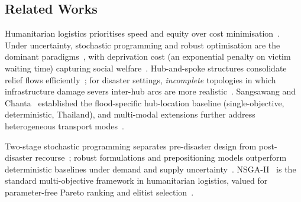 \documentclass{llncs}
\begin{document}
%

\subsection{Related Works}

Humanitarian logistics prioritises speed and equity over cost minimisation~\cite{van2006humanitarian}. Under uncertainty, stochastic programming and robust optimisation are the dominant paradigms~\cite{donmez2021humanitarian,boonmee2017facility}, with deprivation cost (an exponential penalty on victim waiting time) capturing social welfare~\cite{holguin2013appropriate}. Hub-and-spoke structures consolidate relief flows efficiently~\cite{campbell1994integer}; for disaster settings, \emph{incomplete} topologies in which infrastructure damage severs inter-hub arcs are more realistic~\cite{alumur2009incomplete}. Sangsawang and Chanta~\cite{sangsawang2020capacitated} established the flood-specific hub-location baseline (single-objective, deterministic, Thailand), and multi-modal extensions further address heterogeneous transport modes~\cite{Li2023}.

Two-stage stochastic programming separates pre-disaster design from post-disaster recourse~\cite{tofighi2016humanitarian}; robust formulations and prepositioning models outperform deterministic baselines under demand and supply uncertainty~\cite{Yahyaei2019,salman2015emergency}. NSGA-II~\cite{deb2002fast} is the standard multi-objective framework in humanitarian logistics, valued for parameter-free Pareto ranking and elitist selection~\cite{Zhou2017,Li2023}.
\end{document}
